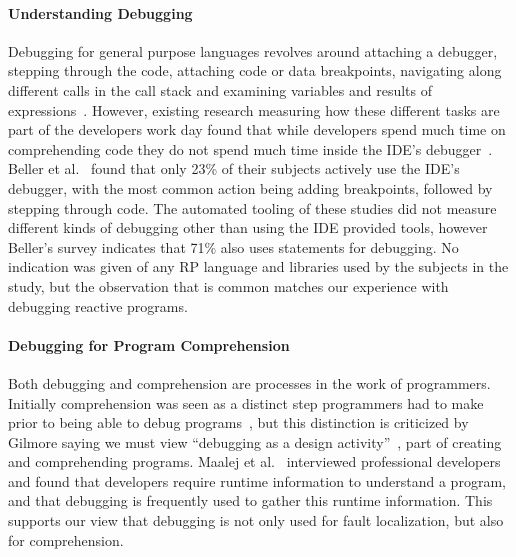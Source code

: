 \paragraph{Understanding Debugging}
Debugging for general purpose languages revolves around 
attaching a debugger,
stepping through the code, 
attaching code or data breakpoints, 
navigating along different calls in the call stack and 
examining variables and results of expressions~\cite{Spinellis2017}.
However, existing research measuring how these different tasks are part of the developers work day found that 
while developers spend much time on comprehending code they do not spend much time inside the IDE's debugger~\cite{minelli2015know}.
Beller et al.~\cite{beller2017behavior} found that only 23\% of their subjects actively use the IDE's debugger,
with the most common action being adding breakpoints, followed by stepping through code.
The automated tooling of these studies did not measure different kinds of debugging other than using the IDE provided tools, 
however Beller's survey indicates that 71\% also uses  statements for debugging.
No indication was given of any RP language and libraries used by the subjects in the study, 
but the observation that \printfdebugging{} is common matches our experience with debugging reactive programs.



\paragraph{Debugging for Program Comprehension}
Both debugging and comprehension are processes in the work of programmers.
Initially comprehension was seen as a distinct step programmers had to make
prior to being able to debug programs~\cite{katz1987debugging}, 
but this distinction is criticized by Gilmore saying we must view 
``debugging as a design activity''~\cite{gilmore1991models}, 
part of creating and comprehending programs. 
Maalej et al.~\cite{Maalej2014} interviewed professional developers 
and found that developers require runtime information to understand a program,
and that debugging is frequently used to gather this runtime information.
This supports our view that debugging is not only used for fault localization,
but also for comprehension.

